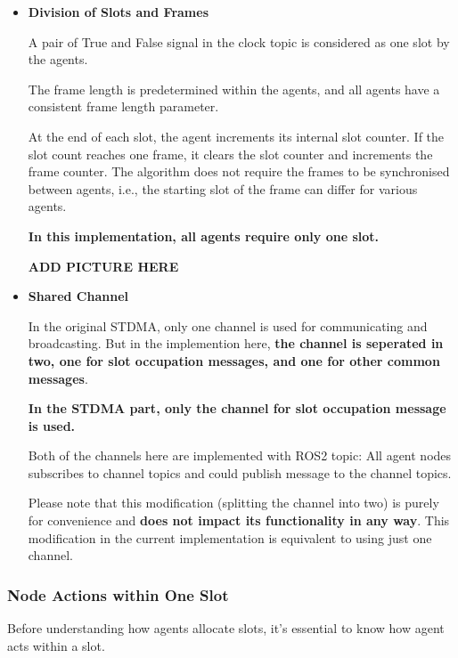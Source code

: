 {\begin{itemize}
    Agent nodes subscribe the clock topic to get the synchronised clock.

    \item \textbf{Division of Slots and Frames}
    
    A pair of True and False signal in the clock topic is considered as one slot by the agents.

    The frame length is predetermined within the agents, and all agents have a consistent frame length parameter.
    
    At the end of each slot, the agent increments its internal slot counter. If the slot count reaches one frame, it clears the slot counter and increments the frame counter. The algorithm does not require the frames to be synchronised between agents, i.e., the starting slot of the frame can differ for various agents.
    
    \textbf{In this implementation, all agents require only one slot.}

    \textbf{ADD PICTURE HERE}

    \item \textbf{Shared Channel}
    
    In the original STDMA\cite{STDMA}, only one channel is used for communicating and broadcasting. 
    But in the implemention here, \textbf{the channel is seperated in two, one for slot occupation messages, and one for other common messages}.
    
    \textbf{In the STDMA part, only the channel for slot occupation message is used.}

    Both of the channels here are implemented with ROS2 topic: All agent nodes subscribes to channel topics and could publish message to the channel topics.    

    Please note that this modification (splitting the channel into two) is purely for convenience and \textbf{does not impact its functionality in any way}.
    This modification in the current implementation is equivalent to using just one channel.    

\end{itemize}


\subsubsection{Node Actions within One Slot}


Before understanding how agents allocate slots, it's essential to know how agent acts within a slot.

}
